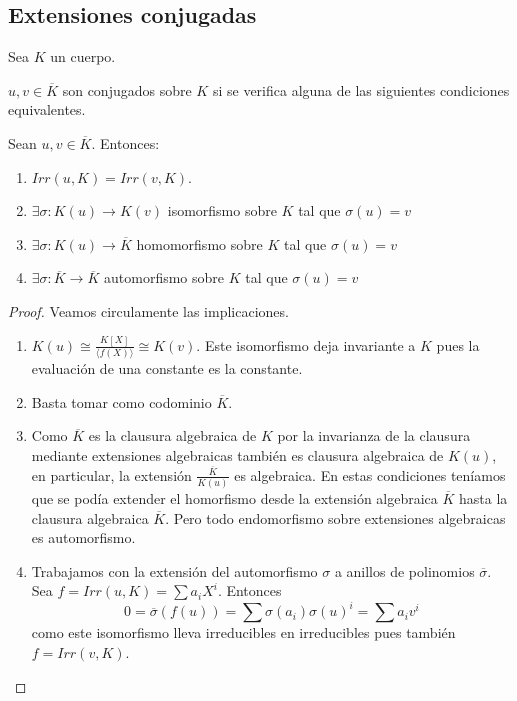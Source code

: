 \subsection{Extensiones conjugadas}

\begin{definition}
Sea $K$ un cuerpo. 

$u,v \in \overline{K}$ son conjugados sobre $K$ si se verifica alguna de las siguientes condiciones equivalentes.
\end{definition}

\begin{proposition}
Sean $u,v \in \overline{K}$. Entonces:

\begin{enumerate}
\item $Irr(u,K) = Irr(v,K)$. 
\item $\exists \sigma: K(u) \to K(v)$ isomorfismo sobre $K$ tal que $\sigma(u) = v$
\item $\exists \sigma:K(u) \to \overline{K}$ homomorfismo sobre $K$ tal que $\sigma(u) = v$
\item $\exists \sigma:\overline{K} \to \overline{K}$ automorfismo sobre $K$ tal que $\sigma(u)= v$
\end{enumerate}
\end{proposition}
\begin{proof}
Veamos circulamente las implicaciones.

\begin{enumerate}
\item $K(u) \cong \frac{K[X]}{\langle f(X) \rangle} \cong K(v)$. Este isomorfismo deja invariante a $K$ pues la evaluación de una constante es la constante. 
\item Basta tomar como codominio $\overline{K}$.
\item Como $\overline{K}$ es la clausura algebraica de $K$ por la invarianza de la clausura mediante extensiones algebraicas también es clausura algebraica de $K(u)$, en particular, la extensión $\frac{\overline{K}}{K(u)}$ es algebraica. En estas condiciones teníamos que se podía extender el homorfismo desde la extensión algebraica $\overline{K}$ hasta la clausura algebraica $\overline{K}$. Pero todo endomorfismo sobre extensiones algebraicas es automorfismo.
\item Trabajamos con la extensión del automorfismo $\sigma$ a anillos de polinomios $\overline{\sigma}$. Sea $f = Irr(u,K) = \sum a_iX^i$. Entonces $$0 = \overline{\sigma}(f(u)) = \sum \sigma(a_i)\sigma(u)^i = \sum a_i v^i$$ como este isomorfismo lleva irreducibles en irreducibles pues también $f = Irr(v,K)$. 
\end{enumerate}
\end{proof}

